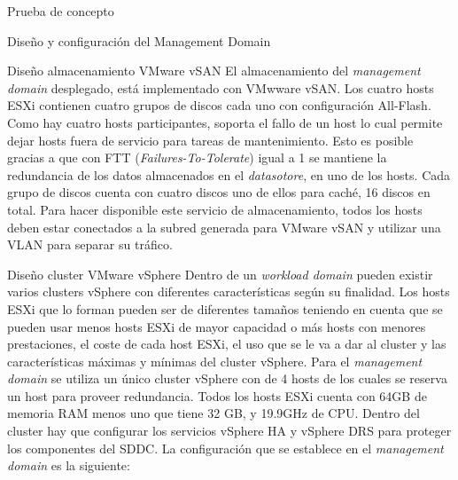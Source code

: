 \begin{section}{Prueba de concepto}
\begin{subsection}{Diseño y configuración del Management Domain}
\begin{figure}[h]
      \label{fig:cluster-vCenter-Server}
    \end{figure}
    \FloatBarrier
    
    \begin{subsubsection}{Diseño almacenamiento VMware vSAN}
      El almacenamiento del \textit{management domain} desplegado, está implementado con VMwware vSAN. Los cuatro hosts ESXi contienen cuatro grupos de discos cada uno con configuración All-Flash. Como hay cuatro hosts participantes, soporta el fallo de un host lo cual permite dejar hosts fuera de servicio para tareas de mantenimiento. Esto es posible gracias a que con FTT (\textit{Failures-To-Tolerate}) igual a 1 se mantiene la redundancia de los datos almacenados en el \textit{datasotore}, en uno de los hosts. Cada grupo de discos cuenta con cuatro discos uno de ellos para caché, 16 discos en total. Para hacer disponible este servicio de almacenamiento, todos los hosts deben estar conectados a la subred generada para VMware vSAN y utilizar una VLAN para separar su tráfico.
    \end{subsubsection}
        
    \begin{subsubsection}{Diseño cluster VMware vSphere}
    Dentro de un \textit{workload domain} pueden existir varios clusters vSphere con diferentes características según su finalidad. Los hosts ESXi que lo forman pueden ser de diferentes tamaños teniendo en cuenta que se pueden usar menos hosts ESXi de mayor capacidad o más hosts con menores prestaciones, el coste de cada host ESXi, el uso que se le va a dar al cluster y las características máximas y mínimas del cluster vSphere. Para el \textit{management domain} se utiliza un único cluster vSphere con de 4 hosts de los cuales se reserva un host para proveer redundancia. Todos los hosts ESXi cuenta con 64GB de memoria RAM menos uno que tiene 32 GB, y 19.9GHz de CPU. Dentro del cluster hay que configurar los servicios vSphere HA y vSphere DRS para proteger los componentes del SDDC. La configuración que se establece en el \textit{management domain} es la siguiente:
   

\end{subsubsection}
\end{subsection}
\end{section}
